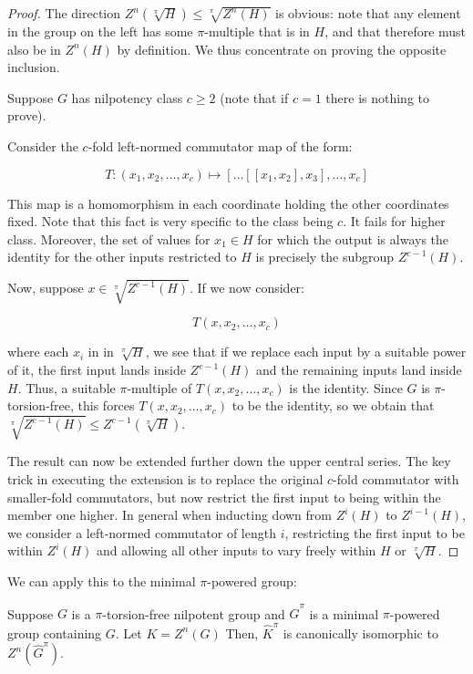 \begin{proof}
  The direction $Z^n(\sqrt[\pi]{H}) \le \sqrt[\pi]{Z^n(H)}$ is
  obvious: note that any element in the group on the left has some
  $\pi$-multiple that is in $H$, and that therefore must also be in
  $Z^n(H)$ by definition. We thus concentrate on proving the opposite
  inclusion.

  Suppose $G$ has nilpotency class $c \ge 2$ (note that if $c = 1$
  there is nothing to prove).

  Consider the $c$-fold left-normed commutator map of the form:

  $$T:(x_1,x_2,\dots,x_c) \mapsto [\dots [[x_1,x_2],x_3],\dots,x_c]$$

  This map is a homomorphism in each coordinate holding the other
  coordinates fixed. Note that this fact is very specific to the class
  being $c$. It fails for higher class. Moreover, the set of values
  for $x_1 \in H$ for which the output is always the identity for the other
  inputs restricted to $H$ is precisely the subgroup $Z^{c-1}(H)$.

  Now, suppose $x \in \sqrt[\pi]{Z^{c-1}(H)}$. If we now consider:

  $$T(x,x_2,\dots,x_c)$$

  where each $x_i$ in in $\sqrt[\pi]{H}$, we see that if we replace
  each input by a suitable power of it, the first input lands inside
  $Z^{c-1}(H)$ and the remaining inputs land inside $H$. Thus, a
  suitable $\pi$-multiple of $T(x,x_2,\dots,x_c)$ is the
  identity. Since $G$ is $\pi$-torsion-free, this forces
  $T(x,x_2,\dots,x_c)$ to be the identity, so we obtain that
  $\sqrt[\pi]{Z^{c-1}(H)} \le Z^{c-1}(\sqrt[\pi]{H})$.

  The result can now be extended further down the upper central
  series. The key trick in executing the extension is to replace the
  original $c$-fold commutator with smaller-fold commutators, but now
  restrict the first input to being within the member one higher. In
  general when inducting down from $Z^i(H)$ to $Z^{i-1}(H)$, we
  consider a left-normed commutator of length $i$, restricting the
  first input to be within $Z^i(H)$ and allowing all other inputs to
  vary freely within $H$ or $\sqrt[\pi]{H}$.  
\end{proof}

We can apply this to the minimal $\pi$-powered group:

\begin{lemma}
  Suppose $G$ is a $\pi$-torsion-free nilpotent group and
  $\hat{G}^\pi$ is a minimal $\pi$-powered group containing $G$. Let
  $K = Z^n(G)$ Then, $\hat{K}^{\pi}$ is canonically isomorphic to
  $Z^n(\hat{G}^{\pi})$.
\end{lemma}

